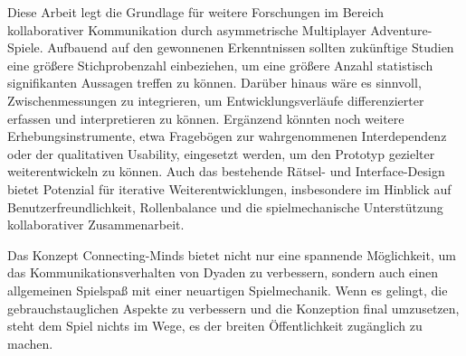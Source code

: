 Diese Arbeit legt die Grundlage für weitere Forschungen im Bereich kollaborativer Kommunikation durch asymmetrische Multiplayer Adventure-Spiele.
Aufbauend auf den gewonnenen Erkenntnissen sollten zukünftige Studien eine größere Stichprobenzahl einbeziehen, um eine größere Anzahl statistisch signifikanten Aussagen treffen zu können. Darüber hinaus wäre es sinnvoll, Zwischenmessungen zu integrieren, um Entwicklungsverläufe differenzierter erfassen und interpretieren zu können. Ergänzend könnten noch weitere Erhebungsinstrumente, etwa Fragebögen zur wahrgenommenen Interdependenz oder der qualitativen Usability, eingesetzt werden, um den Prototyp gezielter weiterentwickeln zu können. Auch das bestehende Rätsel- und Interface-Design bietet Potenzial für iterative Weiterentwicklungen, insbesondere im Hinblick auf Benutzerfreundlichkeit, Rollenbalance und die spielmechanische Unterstützung kollaborativer Zusammenarbeit.

Das Konzept Connecting-Minds bietet nicht nur eine spannende Möglichkeit, um das Kommunikationsverhalten von Dyaden zu verbessern, sondern auch einen allgemeinen Spielspaß mit einer neuartigen Spielmechanik. Wenn es gelingt, die gebrauchstauglichen Aspekte zu verbessern und die Konzeption final umzusetzen, steht dem Spiel nichts im Wege, es der breiten Öffentlichkeit zugänglich zu machen.